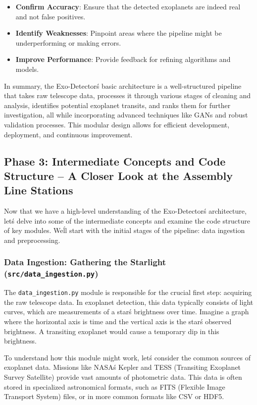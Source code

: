 \documentclass{article}
\begin{document}
\begin{itemize}
    \item \textbf{Confirm Accuracy}: Ensure that the detected exoplanets are indeed real and not false positives.
    \item \textbf{Identify Weaknesses}: Pinpoint areas where the pipeline might be underperforming or making errors.
    \item \textbf{Improve Performance}: Provide feedback for refining algorithms and models.
\end{itemize}

In summary, the Exo-Detector\'s basic architecture is a well-structured pipeline that takes raw telescope data, processes it through various stages of cleaning and analysis, identifies potential exoplanet transits, and ranks them for further investigation, all while incorporating advanced techniques like GANs and robust validation processes. This modular design allows for efficient development, deployment, and continuous improvement.

\subsection{Phase 3: Intermediate Concepts and Code Structure – A Closer Look at the Assembly Line Stations}

Now that we have a high-level understanding of the Exo-Detector\'s architecture, let\'s delve into some of the intermediate concepts and examine the code structure of key modules. We\'ll start with the initial stages of the pipeline: data ingestion and preprocessing.

\subsubsection{Data Ingestion: Gathering the Starlight (\texttt{src/data\_ingestion.py})}

The \texttt{data\_ingestion.py} module is responsible for the crucial first step: acquiring the raw telescope data. In exoplanet detection, this data typically consists of light curves, which are measurements of a star\'s brightness over time. Imagine a graph where the horizontal axis is time and the vertical axis is the star\'s observed brightness. A transiting exoplanet would cause a temporary dip in this brightness.

To understand how this module might work, let\'s consider the common sources of exoplanet data. Missions like NASA\'s Kepler and TESS (Transiting Exoplanet Survey Satellite) provide vast amounts of photometric data. This data is often stored in specialized astronomical formats, such as FITS (Flexible Image Transport System) files, or in more common formats like CSV or HDF5.
\end{document}

